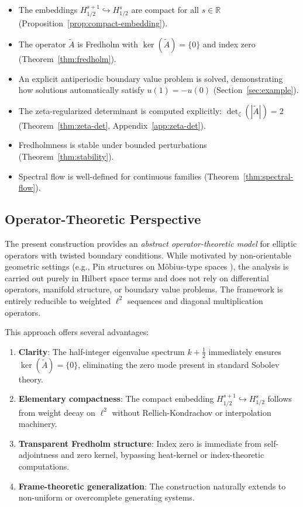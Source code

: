 \documentclass[11pt]{amsart}
\theoremstyle{definition}
\theoremstyle{remark}
\begin{document}
\begin{itemize}
\item The embeddings $H^{s+1}_{1/2} \hookrightarrow H^s_{1/2}$ are compact for all $s\in\mathbb{R}$ (Proposition~\ref{prop:compact-embedding}).
\item The operator $\widetilde{A}$ is Fredholm with $\ker(\widetilde{A})=\{0\}$ and index zero (Theorem~\ref{thm:fredholm}).
\item An explicit antiperiodic boundary value problem is solved, demonstrating how solutions automatically satisfy $u(1) = -u(0)$ (Section~\ref{sec:example}).
\item The zeta-regularized determinant is computed explicitly: $\det_\zeta(|\widetilde{A}|) = 2$ (Theorem~\ref{thm:zeta-det}, Appendix~\ref{app:zeta-det}).
\item Fredholmness is stable under bounded perturbations (Theorem~\ref{thm:stability}).
\item Spectral flow is well-defined for continuous families (Theorem~\ref{thm:spectral-flow}).
\end{itemize}

\subsection*{Operator-Theoretic Perspective}

The present construction provides an \emph{abstract operator-theoretic model} for elliptic operators with twisted boundary conditions. While motivated by non-orientable geometric settings (e.g., Pin structures on M\"obius-type spaces \cite{lawson-michelsohn, atiyah-patodi-singer}), the analysis is carried out purely in Hilbert space terms and does not rely on differential operators, manifold structure, or boundary value problems. The framework is entirely reducible to weighted $\ell^2$ sequences and diagonal multiplication operators.

This approach offers several advantages:
\begin{enumerate}
\item \textbf{Clarity}: The half-integer eigenvalue spectrum $k+\tfrac{1}{2}$ immediately ensures $\ker(\widetilde{A})=\{0\}$, eliminating the zero mode present in standard Sobolev theory.
\item \textbf{Elementary compactness}: The compact embedding $H^{s+1}_{1/2}\hookrightarrow H^s_{1/2}$ follows from weight decay on $\ell^2$ without Rellich-Kondrachov or interpolation machinery.
\item \textbf{Transparent Fredholm structure}: Index zero is immediate from self-adjointness and zero kernel, bypassing heat-kernel or index-theoretic computations.
\item \textbf{Frame-theoretic generalization}: The construction naturally extends to non-uniform or overcomplete generating systems.
\end{enumerate}
\end{document}
